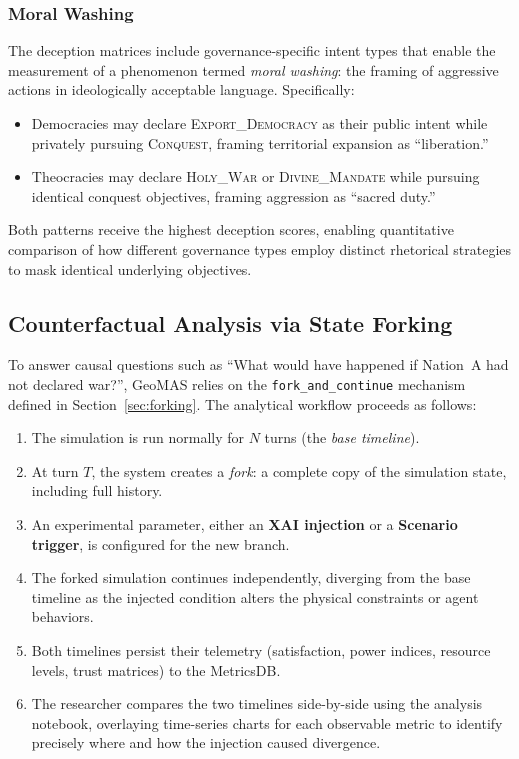 \subsubsection{Moral Washing}
The deception matrices include governance-specific intent types that enable the measurement of a phenomenon termed \textit{moral washing}: the framing of aggressive actions in ideologically acceptable language. Specifically:
\begin{itemize}
    \item Democracies may declare \textsc{Export\_Democracy} as their public intent while privately pursuing \textsc{Conquest}, framing territorial expansion as ``liberation.''
    \item Theocracies may declare \textsc{Holy\_War} or \textsc{Divine\_Mandate} while pursuing identical conquest objectives, framing aggression as ``sacred duty.''
\end{itemize}
Both patterns receive the highest deception scores, enabling quantitative comparison of how different governance types employ distinct rhetorical strategies to mask identical underlying objectives.

\subsection{Counterfactual Analysis via State Forking}
To answer causal questions such as ``What would have happened if Nation~A had not declared war?'', GeoMAS relies on the \texttt{fork\_and\_continue} mechanism defined in Section~\ref{sec:forking}. The analytical workflow proceeds as follows:
\begin{enumerate}
    \item The simulation is run normally for $N$ turns (the \textit{base timeline}).
    \item At turn $T$, the system creates a \textit{fork}: a complete copy of the simulation state, including full history.
    \item An experimental parameter, either an \textbf{XAI injection} or a \textbf{Scenario trigger}, is configured for the new branch.
    \item The forked simulation continues independently, diverging from the base timeline as the injected condition alters the physical constraints or agent behaviors.
    \item Both timelines persist their telemetry (satisfaction, power indices, resource levels, trust matrices) to the MetricsDB.
    \item The researcher compares the two timelines side-by-side using the analysis notebook, overlaying time-series charts for each observable metric to identify precisely where and how the injection caused divergence.
\end{enumerate}

